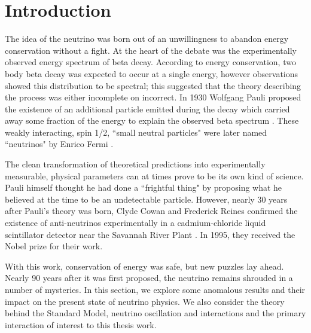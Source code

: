 \documentclass[12pt]{article}
\begin{document}
\tableofcontents
\clearpage

\listoffigures
\setcounter{tocdepth}{3} 

\clearpage
\renewcommand{\thepage}{\arabic{page}}
\setcounter{page}{1}

\section{Introduction}
The idea of the neutrino was born out of an unwillingness to abandon energy conservation without a fight. At the heart of the debate was the experimentally observed energy spectrum of beta decay. According to energy conservation, two body beta decay was expected to occur at a single energy, however observations showed this distribution to be spectral; this suggested that the theory describing the process was either incomplete on incorrect.  In 1930 Wolfgang Pauli proposed the existence of an additional particle emitted during the decay which carried away some fraction of the energy to explain the observed beta spectrum \cite{bib:pauli}. These weakly interacting, spin 1/2, ``small neutral particles" were later named ``neutrinos" by Enrico Fermi \cite{bib:fermi}. 
\par The clean transformation of theoretical predictions into experimentally measurable, physical parameters can at times prove to be its own kind of science. Pauli himself thought he had done a ``frightful thing" by proposing what he believed at the time to be an undetectable particle. However, nearly 30 years after Pauli's theory was born, Clyde Cowan and Frederick Reines confirmed the existence of anti-neutrinos experimentally in a cadmium-chloride liquid scintillator detector near the Savannah River Plant \cite{bib:cowan}. In 1995, they received the Nobel prize for their work.
\par With this work, conservation of energy was safe, but new puzzles lay ahead. Nearly 90 years after it was first proposed, the neutrino remains shrouded in a number of mysteries. In this section, we explore some anomalous results and their impact on the present state of neutrino physics.  We also consider the theory behind the Standard Model, neutrino oscillation and interactions and the primary interaction of interest to this thesis work. 
\end{document}
